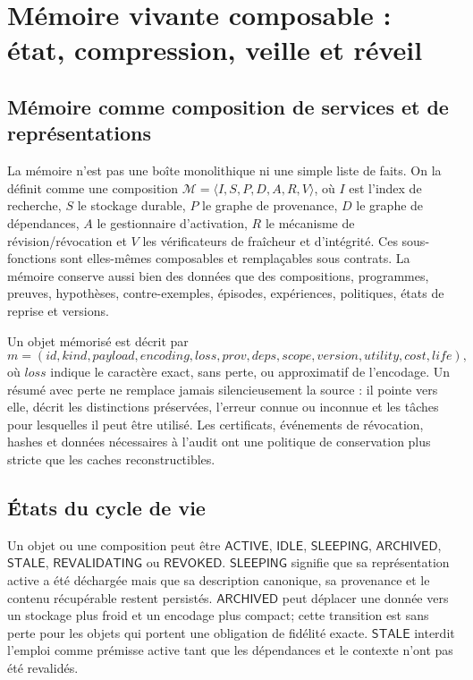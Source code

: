 \documentclass[11pt,a4paper]{article}
\theoremstyle{definition}
\theoremstyle{plain}
\theoremstyle{remark}
\begin{document}
\section{Mémoire vivante composable : état, compression, veille et réveil}
\subsection{Mémoire comme composition de services et de représentations}
La mémoire n'est pas une boîte monolithique ni une simple liste de faits. On la définit comme une composition $\mathcal{M}=\langle I,S,P,D,A,R,V\rangle$, où $I$ est l'index de recherche, $S$ le stockage durable, $P$ le graphe de provenance, $D$ le graphe de dépendances, $A$ le gestionnaire d'activation, $R$ le mécanisme de révision/révocation et $V$ les vérificateurs de fraîcheur et d'intégrité. Ces sous-fonctions sont elles-mêmes composables et remplaçables sous contrats. La mémoire conserve aussi bien des données que des compositions, programmes, preuves, hypothèses, contre-exemples, épisodes, expériences, politiques, états de reprise et versions.

Un objet mémorisé est décrit par
\[
m=(id,kind,payload,encoding,loss,prov,deps,scope,version,utility,cost,life),
\]
où $loss$ indique le caractère exact, sans perte, ou approximatif de l'encodage. Un résumé avec perte ne remplace jamais silencieusement la source : il pointe vers elle, décrit les distinctions préservées, l'erreur connue ou inconnue et les tâches pour lesquelles il peut être utilisé. Les certificats, événements de révocation, hashes et données nécessaires à l'audit ont une politique de conservation plus stricte que les caches reconstructibles.

\subsection{États du cycle de vie}
Un objet ou une composition peut être $\mathsf{ACTIVE}$, $\mathsf{IDLE}$, $\mathsf{SLEEPING}$, $\mathsf{ARCHIVED}$, $\mathsf{STALE}$, $\mathsf{REVALIDATING}$ ou $\mathsf{REVOKED}$. $\mathsf{SLEEPING}$ signifie que sa représentation active a été déchargée mais que sa description canonique, sa provenance et le contenu récupérable restent persistés. $\mathsf{ARCHIVED}$ peut déplacer une donnée vers un stockage plus froid et un encodage plus compact; cette transition est sans perte pour les objets qui portent une obligation de fidélité exacte. $\mathsf{STALE}$ interdit l'emploi comme prémisse active tant que les dépendances et le contexte n'ont pas été revalidés.
\end{document}
